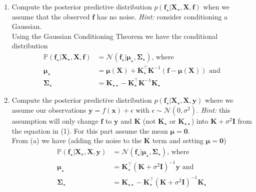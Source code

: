 \documentclass[letter, 12pt]{article}
\begin{document}
\begin{enumerate}
\begin{enumerate}
    \end{enumerate}
    \begin{enumerate}
        \item Compute the posterior predictive distribution
            $p(\mathbf{f}_\star|\mathbf{X}_\star,\mathbf{X},\mathbf{f})$ when
            we assume that the observed $\mathbf{f}$ has no noise. \textit{Hint:}
            consider conditioning a Gaussian.\\[1em]
            Using the Gaussian Conditioning Theorem we have the conditional distribution
            \begin{align*}
                \mathbb{P}(\mathbf{f}_\star | \mathbf{X}_\star, \mathbf{X}, \mathbf{f}) &= \mathcal{N}(\mathbf{f}_\star|\boldsymbol{\mu}_\star,\mathbf{\Sigma}_\star)\text{, where}\\
                \boldsymbol{\mu}_\star &= \boldsymbol{\mu}(\mathbf{X}) + \mathbf{K}_\star^\top\mathbf{K}^{-1}(\mathbf{f} - \boldsymbol{\mu}(\mathbf{X}))\text{ and}\\
                \mathbf{\Sigma}_\star &= \mathbf{K}_{\star\star} - \mathbf{K}_\star^\top \mathbf{K}^{-1}\mathbf{K}_\star
            \end{align*}
            \vfill
        \item Compute the posterior predictive distribution
            $p(\mathbf{f}_\star|\mathbf{X}_\star,\mathbf{X},\mathbf{y})$ where
            we assume our observations $\mathbf{y} = f(\mathbf{x}) + \epsilon$ with
            $\epsilon
            \sim \mathcal{N}(0,\sigma^2)$. \textit{Hint:} this assumption will only
            change $\mathbf{f}$ to $\mathbf{y}$ and $\mathbf{K}$ (not $\mathbf{K}_\star$
            or $\mathbf{K}_{\star\star}$) into $\mathbf{K} + \sigma^2\mathbf{I}$
            from the equation in (1). For this part assume the mean $\boldsymbol{\mu}=
            \mathbf{0}$.\\[1em]
            From (a) we have (adding the noise to the $\mathbf{K}$ term and setting $\boldsymbol{\mu}=\mathbf{0}$)
            \begin{align*}
                \mathbb{P}(\mathbf{f}_\star | \mathbf{X}_\star, \mathbf{X}, \mathbf{y}) &= \mathcal{N}(\mathbf{f}_\star|\boldsymbol{\mu}_\star,\mathbf{\Sigma}_\star)\text{, where}\\
                \boldsymbol{\mu}_\star &= \mathbf{K}_\star^\top\left(\mathbf{K} + \sigma^2 \mathbf{I}\right)^{-1}\mathbf{y}\text{ and}\\
                \mathbf{\Sigma}_\star &= \mathbf{K}_{\star\star} - \mathbf{K}_\star^\top \left(\mathbf{K}+\sigma^2\mathbf{I}\right)^{-1}\mathbf{K}_\star

\end{align*}
\end{enumerate}
\end{enumerate}
\end{document}
